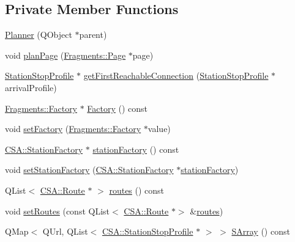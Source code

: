 \subsection*{Private Member Functions}
\begin{DoxyCompactItemize}
\item 
\mbox{\hyperlink{classCSA_1_1Planner_aa0015d0596c5b78bf29f65276fcc8852}{Planner}} (Q\+Object $\ast$parent)
\item 
void \mbox{\hyperlink{classCSA_1_1Planner_a2539dd808dc988ef5cb0b4b7f4de0077}{plan\+Page}} (\mbox{\hyperlink{classFragments_1_1Page}{Fragments\+::\+Page}} $\ast$page)
\item 
\mbox{\hyperlink{classCSA_1_1StationStopProfile}{Station\+Stop\+Profile}} $\ast$ \mbox{\hyperlink{classCSA_1_1Planner_a68af05f5dc3eaa5d204224c21c80f42d}{get\+First\+Reachable\+Connection}} (\mbox{\hyperlink{classCSA_1_1StationStopProfile}{Station\+Stop\+Profile}} $\ast$arrival\+Profile)
\item 
\mbox{\hyperlink{classFragments_1_1Factory}{Fragments\+::\+Factory}} $\ast$ \mbox{\hyperlink{classCSA_1_1Planner_a7395c140e3cd577ed459350d4e5588ad}{Factory}} () const
\item 
void \mbox{\hyperlink{classCSA_1_1Planner_a6f6fe97b8620230960514f544109f076}{set\+Factory}} (\mbox{\hyperlink{classFragments_1_1Factory}{Fragments\+::\+Factory}} $\ast$value)
\item 
\mbox{\hyperlink{classCSA_1_1StationFactory}{C\+S\+A\+::\+Station\+Factory}} $\ast$ \mbox{\hyperlink{classCSA_1_1Planner_aa6f6d8a3714aa2846f19a41da4f1959b}{station\+Factory}} () const
\item 
void \mbox{\hyperlink{classCSA_1_1Planner_a67b39227b11c5d49052c48141ad256ac}{set\+Station\+Factory}} (\mbox{\hyperlink{classCSA_1_1StationFactory}{C\+S\+A\+::\+Station\+Factory}} $\ast$\mbox{\hyperlink{classCSA_1_1Planner_aa6f6d8a3714aa2846f19a41da4f1959b}{station\+Factory}})
\item 
Q\+List$<$ \mbox{\hyperlink{classCSA_1_1Route}{C\+S\+A\+::\+Route}} $\ast$ $>$ \mbox{\hyperlink{classCSA_1_1Planner_a1ecc41dc060aafd6e2ce0f2c4a52648b}{routes}} () const
\item 
void \mbox{\hyperlink{classCSA_1_1Planner_a596d6e4038e76ff4944cab418594858f}{set\+Routes}} (const Q\+List$<$ \mbox{\hyperlink{classCSA_1_1Route}{C\+S\+A\+::\+Route}} $\ast$$>$ \&\mbox{\hyperlink{classCSA_1_1Planner_a1ecc41dc060aafd6e2ce0f2c4a52648b}{routes}})
\item 
Q\+Map$<$ Q\+Url, Q\+List$<$ \mbox{\hyperlink{classCSA_1_1StationStopProfile}{C\+S\+A\+::\+Station\+Stop\+Profile}} $\ast$ $>$ $>$ \mbox{\hyperlink{classCSA_1_1Planner_af8b23db7e72d8bf8d7a219d569c853c6}{S\+Array}} () const
$$
\end{DoxyCompactItemize}
